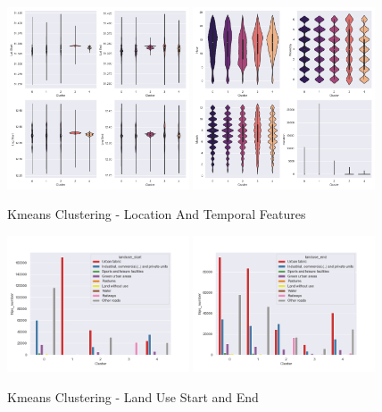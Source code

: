 \begin{figure}[htp]
    \centering
    \includegraphics[width=0.48\textwidth]{Figures/Clustering/clusters_lat_start.png}
    \includegraphics[width=0.48\textwidth]{Figures/Clustering/clusters_hour.png}
    \caption{Kmeans Clustering - Location And Temporal Features}
    \label{fig:kmeans_loc_temp}
\end{figure}
\begin{figure}[htp]
    \centering
    \includegraphics[width=0.48\textwidth]{Figures/Clustering/landuse_start.png}
    \includegraphics[width=0.48\textwidth]{Figures/Clustering/landuse_end.png}
    \caption{Kmeans Clustering - Land Use Start and End}
    \label{fig:kmeans_land_use}
\end{figure}
